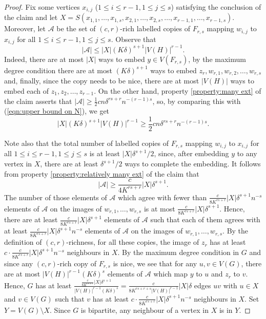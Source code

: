 \begin{proof}
	Fix some vertices $x_{i,j}$ ($1\leq i\leq r-1,1\leq j\leq s$) satisfying the conclusion of the claim and let $X=S(x_{1,1},\dots,x_{1,s},x_{2,1},\dots,x_{2,s},\dots,x_{r-1,1},\dots,x_{r-1,s})$. Moreover, let $\mathcal{A}$ be the set of $(c,r)$-rich labelled copies of $F_{r,s}$ mapping $w_{i,j}$ to $x_{i,j}$ for all $1\leq i\leq r-1,1\leq j\leq s$.
	Observe that
	\begin{equation}
	    |\mathcal{A}|\leq |X|(K\delta)^{s+1}|V(H)|^{r-1}. \label{eqn:upper bound on N}
	\end{equation}
	Indeed, there are at most $|X|$ ways to embed $y\in V(F_{r,s})$, by the maximum degree condition there are at most $(K\delta)^{s+1}$ ways to embed $z_r,w_{r,1},w_{r,2},\dots,w_{r,s}$ and, finally, since the copy needs to be nice, there are at most $|V(H)|$ ways to embed each of $z_1,z_2,\dots,z_{r-1}$. On the other hand, property \ref{property:many ext} of the claim asserts that $|\mathcal{A}|\geq \frac{1}{2}cn\delta^{rs+r}n^{-(r-1)s}$, so, by comparing this with (\ref{eqn:upper bound on N}), we get
	\begin{equation}
	    |X|(K\delta)^{s+1}|V(H)|^{r-1}\geq \frac{1}{2}cn\delta^{rs+r}n^{-(r-1)s}. \label{eqn:lower bound on |X|}
	\end{equation}
	
	Note also that the total number of labelled copies of $F_{r,s}$ mapping $w_{i,j}$ to $x_{i,j}$ for all $1\leq i\leq r-1,1\leq j\leq s$ is at least $|X|\delta^{s+1}/2$, since, after embedding $y$ to any vertex in $X$, there are at least $\delta^{s+1}/2$ ways to complete the embedding. It follows from property \ref{property:relatively many ext} of the claim that
	\begin{equation*}
	    |\mathcal{A}|\geq \frac{c}{4K^{rs+r}}|X|\delta^{s+1}.
	\end{equation*}
	The number of those elements of $\mathcal{A}$ which agree with fewer than $\frac{c}{8K^{rs+r}}|X|\delta^{s+1}n^{-s}$ elements of $\mathcal{A}$ on the images of $w_{r,1},\dots,w_{r,s}$ is at most $\frac{c}{8K^{rs+r}}|X|\delta^{s+1}$. Hence, there are at least $\frac{c}{8K^{rs+r}}|X|\delta^{s+1}$ elements of $\mathcal{A}$ such that each of them agrees with at least $\frac{c}{8K^{rs+r}}|X|\delta^{s+1}n^{-s}$ elements of $\mathcal{A}$ on the images of $w_{r,1},\dots,w_{r,s}$. By the definition of $(c,r)$-richness, for all these copies, the image of $z_r$ has at least $c\cdot \frac{c}{8K^{rs+r}}|X|\delta^{s+1}n^{-s}$ neighbours in $X$. By the maximum degree condition in $G$ and since any $(c,r)$-rich copy of $F_{r,s}$ is nice, we see that for any $u,v\in V(G)$, there are at most $|V(H)|^{r-1}(K\delta)^s$ elements of $\mathcal{A}$ which map $y$ to $u$ and $z_r$ to $v$.
Hence, $G$ has at least $\frac{\frac{c}{8K^{rs+r}}|X|\delta^{s+1}}{|V(H)|^{r-1}(K\delta)^s}=\frac{c}{8K^{rs+r+s}|V(H)|^{r-1}}|X|\delta$ edges $uv$ with $u\in X$ and $v\in V(G)$ such that $v$ has at least $c\cdot \frac{c}{8K^{rs+r}}|X|\delta^{s+1}n^{-s}$ neighbours in $X$. Set $Y=V(G)\setminus X$. Since $G$ is bipartite, any neighbour of a vertex in $X$ is in $Y$.
	

\end{proof}
